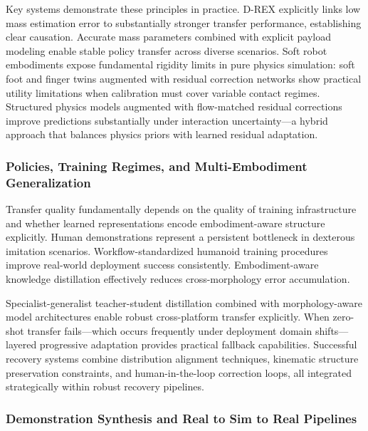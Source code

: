 ﻿\documentclass[11pt,a4paper]{article}
\begin{document}
Key systems demonstrate these principles in practice. D-REX explicitly links low mass estimation error to substantially stronger transfer performance, establishing clear causation. Accurate mass parameters combined with explicit payload modeling enable stable policy transfer across diverse scenarios. Soft robot embodiments expose fundamental rigidity limits in pure physics simulation: soft foot and finger twins augmented with residual correction networks show practical utility limitations when calibration must cover variable contact regimes. Structured physics models augmented with flow-matched residual corrections improve predictions substantially under interaction uncertainty—a hybrid approach that balances physics priors with learned residual adaptation.

\subsubsection{Policies, Training Regimes, and Multi-Embodiment Generalization}

Transfer quality fundamentally depends on the quality of training infrastructure and whether learned representations encode embodiment-aware structure explicitly. Human demonstrations represent a persistent bottleneck in dexterous imitation scenarios. Workflow-standardized humanoid training procedures improve real-world deployment success consistently. Embodiment-aware knowledge distillation effectively reduces cross-morphology error accumulation.

Specialist-generalist teacher-student distillation combined with morphology-aware model architectures enable robust cross-platform transfer explicitly. When zero-shot transfer fails—which occurs frequently under deployment domain shifts—layered progressive adaptation provides practical fallback capabilities. Successful recovery systems combine distribution alignment techniques, kinematic structure preservation constraints, and human-in-the-loop correction loops, all integrated strategically within robust recovery pipelines.

\subsubsection{Demonstration Synthesis and Real to Sim to Real Pipelines}
\end{document}
